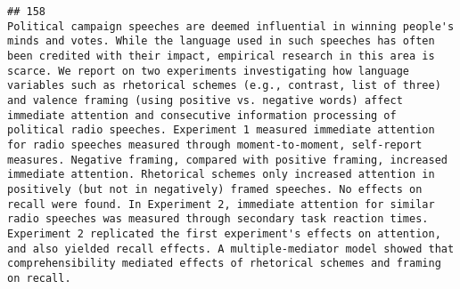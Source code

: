 \documentclass[
  english,
  man]{apa6}
\begin{document}
\begin{verbatim}
## 158                                                                                                                                                                                                                                                                                                                                                                                                                                                                                                                                                                                                                                                                                                                                                                                                                                                                                                                                                                                                                                                                                                                                                                                                                                                                                                                                                                                                                                                                    Political campaign speeches are deemed influential in winning people's minds and votes. While the language used in such speeches has often been credited with their impact, empirical research in this area is scarce. We report on two experiments investigating how language variables such as rhetorical schemes (e.g., contrast, list of three) and valence framing (using positive vs. negative words) affect immediate attention and consecutive information processing of political radio speeches. Experiment 1 measured immediate attention for radio speeches measured through moment-to-moment, self-report measures. Negative framing, compared with positive framing, increased immediate attention. Rhetorical schemes only increased attention in positively (but not in negatively) framed speeches. No effects on recall were found. In Experiment 2, immediate attention for similar radio speeches was measured through secondary task reaction times. Experiment 2 replicated the first experiment's effects on attention, and also yielded recall effects. A multiple-mediator model showed that comprehensibility mediated effects of rhetorical schemes and framing on recall.

\end{verbatim}
\end{document}
